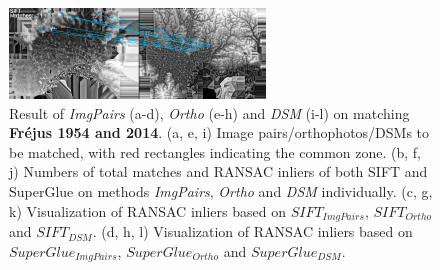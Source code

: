 \begin{figure}[htbp]
\begin{center}
{            \begin{minipage}[t]{0.48\linewidth}
                \centering
                \includegraphics[width=6.8cm]{images/Chapitre3/Homol-SIFT2Step-Rough-2DRANSAC_MEC-Malt_Tapas_1954_MEC-Malt_2014.png}
            \end{minipage}%
        }
        \caption{{\scriptsize Result of \textit{ImgPairs} (a-d), \textit{Ortho} (e-h) and \textit{DSM} (i-l) on matching \textbf{Fr{\'e}jus 1954 and 2014}. (a, e, i) Image pairs/orthophotos/DSMs to be matched, with red rectangles indicating the common zone. (b, f, j) Numbers of total matches and RANSAC inliers of both SIFT and SuperGlue on methods \textit{ImgPairs}, \textit{Ortho} and \textit{DSM} individually. (c, g, k) Visualization of RANSAC inliers based on $SIFT_{ImgPairs}$, $SIFT_{Ortho}$ and $SIFT_{DSM}$. (d, h, l) Visualization of RANSAC inliers based on $SuperGlue_{ImgPairs}$, $SuperGlue_{Ortho}$ and $SuperGlue_{DSM}$.}}
        \label{MatchVizFrejus1954DSM}
    \end{center}
\end{figure} 



